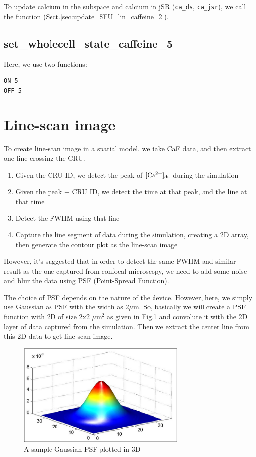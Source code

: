 To update calcium in the subspace and calcium in jSR (\verb!ca_ds!,
\verb!ca_jsr!), we call the function (Sect.\ref{sec:update_SFU_lin_caffeine_2}). 

\subsection{set\_wholecell\_state\_caffeine\_5}
\label{sec:set_wholecell_state_caffeine_5}

Here, we use two functions: 
\begin{verbatim}
ON_5
OFF_5
\end{verbatim}

\section{Line-scan image}
\label{sec:line-scan_image}

To create line-scan image in a spatial model, we take CaF data, and then extract
one line crossing the CRU. 
\begin{enumerate}
  \item Given the CRU ID, we detect the peak of $[{\text{Ca}^{2+}}]_{\text{ds}}$ during the
  simulation
  \item Given the peak + CRU ID, we detect the time at that peak, and the line
  at that time
  \item Detect the FWHM using that line
  \item Capture the line segment of data during the simulation, creating a 2D
  array, then generate the contour plot as the line-scan image
  \end{enumerate}

However, it's suggested that in order to detect the same FWHM and similar result
as the one captured from confocal microscopy, we need to add some noise and
blur the data using PSF (Point-Spread Function). 

The choice of PSF depends on the nature of the device. However, here, we simply
use Gaussian as PSF with the width as 2$\mu$m. So, basically we will create a
PSF function with 2D of size 2x2 $\mu$m$^2$ as given in Fig.\ref{fig:gaussian_psf} and
convolute it with the 2D layer of data captured from the simulation. Then we extract the
center line from this 2D data to get line-scan image. 

\begin{figure}[hbt]
  \centerline{\includegraphics[height=5cm,angle=0]{./images/psf_gaussian.eps}}
  \caption{A sample Gaussian PSF plotted in 3D}
  \label{fig:gaussian_psf}
\end{figure}  

